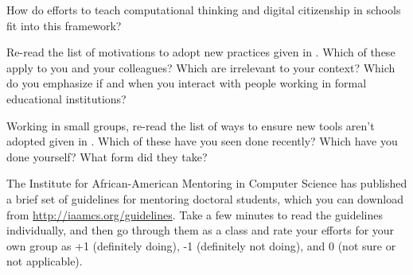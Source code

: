 How do efforts to teach computational thinking and digital citizenship
in schools fit into this framework?


Re-read the list of motivations to adopt new practices given in
.  Which of these apply to you and your
colleagues?  Which are irrelevant to your context?  Which do you
emphasize if and when you interact with people working in formal
educational institutions?


Working in small groups, re-read the list of ways to ensure new tools
aren't adopted given in .  Which of these have
you seen done recently?  Which have you done yourself?  What form did
they take?


The Institute for African-American Mentoring in Computer Science has
published a brief set of guidelines for mentoring doctoral students,
which you can download from \url{http://iaamcs.org/guidelines}.  Take
a few minutes to read the guidelines individually, and then go through
them as a class and rate your efforts for your own group as +1
(definitely doing), -1 (definitely not doing), and 0 (not sure or not
applicable).
